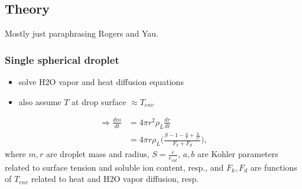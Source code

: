 \documentclass{article}
\begin{document}
\subsection{Theory}

\noindent Mostly just paraphrasing Rogers and Yau.

\subsubsection{Single spherical droplet}
\begin{itemize}
	\item solve H2O vapor and heat diffusion equations
	\item also assume $T$ at drop surface $\approx T_{env}$
\end{itemize}
\begin{align}
\Rightarrow \frac{dm}{dt} &= 4\pi r^2 \rho_L \frac{dr}{dt} \nonumber\\
&= 4\pi r \rho_L \Bigg(\frac{S - 1 - \frac{a}{r} + \frac{b}{r^3}}{F_k + F_d}\Bigg),
\end{align}
where $m,r$ are droplet mass and radius, $S=\frac{e}{e_{sat}}$, $a,b$ are Kohler parameters related to surface tension and soluble ion content, resp., and $F_k, F_d$ are functions of $T_{env}$ related to heat and H2O vapor diffusion, resp.
\end{document}
